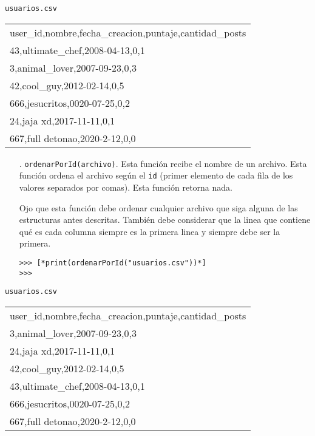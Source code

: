 \begin{center}
    \texttt{usuarios.csv} \\
	\begin{tabular}{|l|}
		\hline
user\_id,nombre,fecha\_creacion,puntaje,cantidad\_posts\\
43,ultimate\_chef,2008-04-13,0,1\\
3,animal\_lover,2007-09-23,0,3\\
42,cool\_guy,2012-02-14,0,5\\
666,jesucritos,0020-07-25,0,2\\
24,jaja xd,2017-11-11,0,1\\
667,full detonao,2020-2-12,0,0\\
		\hline
	\end{tabular}
\end{center}

\begin{enumerate}

    \item[\textbullet.] \texttt{ordenarPorId(archivo)}. Esta función recibe el nombre de un archivo. Esta función ordena el archivo según el \texttt{id} (primer elemento de cada fila de los valores separados por comas). Esta función retorna nada.

    Ojo que esta función debe ordenar cualquier archivo que siga alguna de las estructuras antes descritas. También debe considerar que la linea que contiene qué es cada columna siempre es la primera linea y siempre debe ser la primera.

    \begin{lstlisting}[style=consola]
>>> [*print(ordenarPorId("usuarios.csv"))*]
>>> 
    \end{lstlisting}

\end{enumerate}

\begin{center}
    \texttt{usuarios.csv} \\
	\begin{tabular}{|l|}
		\hline
user\_id,nombre,fecha\_creacion,puntaje,cantidad\_posts\\
3,animal\_lover,2007-09-23,0,3\\
24,jaja xd,2017-11-11,0,1\\
42,cool\_guy,2012-02-14,0,5\\
43,ultimate\_chef,2008-04-13,0,1\\
666,jesucritos,0020-07-25,0,2\\
667,full detonao,2020-2-12,0,0\\
		\hline
	\end{tabular}
\end{center}

